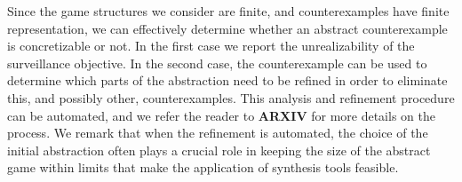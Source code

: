 Since the game structures we consider are finite, and counterexamples have finite representation, we can effectively determine whether an abstract counterexample is concretizable or not. In the first case we report the unrealizability of the surveillance objective. In the second case, the counterexample can be used to determine which parts of the abstraction need to be refined in order to eliminate this, and possibly other, counterexamples. This analysis and refinement procedure can be automated, and we refer the reader to \textbf{ARXIV} for more details on the process. We remark that when the refinement is automated, the choice of the initial abstraction often plays a crucial role in keeping the size of the abstract game within limits that make the application of synthesis tools feasible.
